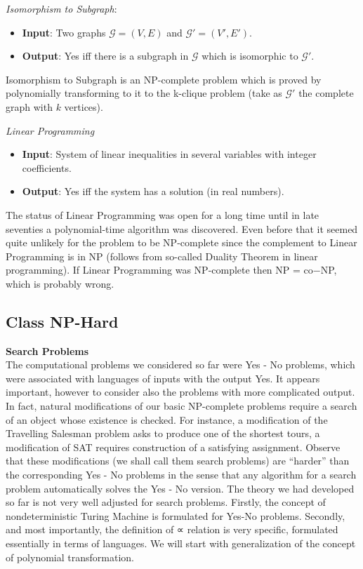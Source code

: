 \textit{Isomorphism to Subgraph}:
\begin{itemize}
    \item \textbf{Input}:
        Two graphs $\mathcal{G} = (V, E)$
        and $\mathcal{G}\prime = (V\prime, E\prime)$.
    \item \textbf{Output}:
        Yes iff there is a subgraph in $\mathcal{G}$ which is isomorphic to $\mathcal{G}\prime$.
\end{itemize}

Isomorphism to Subgraph is an NP-complete problem
which is proved by polynomially transforming to it to the k-clique problem
(take as $\mathcal{G}\prime$ the complete graph with $k$ vertices).

\textit{Linear Programming}
\begin{itemize}
    \item \textbf{Input}: System of linear inequalities in several variables with integer coefficients.
    \item \textbf{Output}: Yes iff the system has a solution (in real numbers).
\end{itemize}

The status of Linear Programming was open for a long time
until in late seventies a polynomial-time algorithm was discovered.
Even before that it seemed quite unlikely for the problem to be NP-complete
since the complement to Linear Programming is in NP
(follows from so-called Duality Theorem in linear programming).
If Linear Programming was NP-complete then NP = co−NP, which is probably wrong.

\subsection{Class NP-Hard}
\textbf{Search Problems}\\
The computational problems we considered so far were Yes - No problems,
which were associated with languages of inputs with the output Yes.
It appears important,
however to consider also the problems with more complicated output.
In fact, natural modifications of our basic NP-complete problems
require a search of an object whose existence is checked.
For instance, a modification of the Travelling Salesman problem asks
to produce one of the shortest tours,
a modification of SAT requires construction of a satisfying assignment.
Observe that these modifications
(we shall call them search problems)
are “harder” than the corresponding Yes - No problems
in the sense that any algorithm for a search problem automatically solves the Yes - No version.
The theory we had developed so far is not very well adjusted for search problems.
Firstly, the concept of nondeterministic Turing Machine
is formulated for Yes-No problems.
Secondly, and most importantly,
the definition of ∝ relation is very specific,
formulated essentially in terms of languages.
We will start with generalization of the concept of polynomial transformation.

